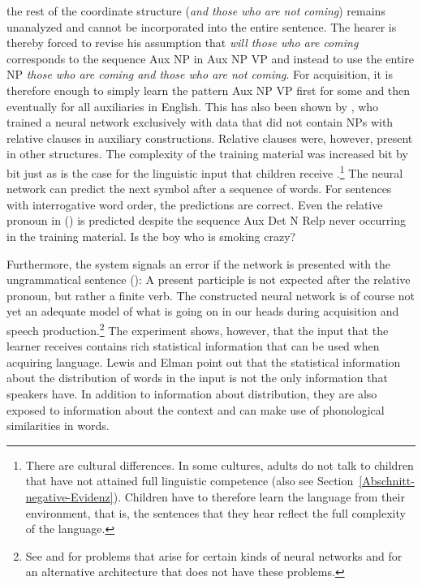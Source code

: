 the rest of the coordinate structure (\emph{and those who are not coming}) remains unanalyzed and cannot be incorporated into the entire sentence.
The hearer is thereby forced to revise his assumption that \emph{will those who are coming} corresponds to the sequence Aux NP in Aux NP VP and instead to
use the entire NP \emph{those who are coming and those who are not coming}.
For acquisition, it is therefore enough to simply learn the pattern Aux NP VP first for some and then eventually for all auxiliaries in English.
This has also been shown by \citet{LE2001a}, who trained a neural network exclusively with data that did not contain NPs with relative
clauses in auxiliary constructions. Relative clauses were, however, present in other structures. The complexity of the training material was increased bit
by bit just as is the case for the linguistic input that children receive
\citep{Elman93a}.\footnote{%
	There are cultural differences. In some cultures, adults do not talk to children that have not attained
	full linguistic competence \citep{Ochs82a,OS85a} (also see
  Section~\ref{Abschnitt-negative-Evidenz}). Children have to therefore learn the language from their environment, that is, the sentences that
  they hear reflect the full complexity of the language.
} The neural network can predict the next symbol after a sequence of words. For sentences with interrogative word order, the predictions are correct.
Even the relative pronoun in () is predicted despite the sequence Aux Det N Relp never occurring in the training material.
\ea
Is the boy who is smoking crazy?
\z

\noindent
Furthermore, the system signals an error if the network is presented with the ungrammatical sentence ():
\z
A present participle is not expected after the relative pronoun, but rather a finite verb. The constructed neural network is of course not yet an adequate model of what is
going on in our heads during acquisition and speech production.\footnote{%
  See \citet[]{Hurford2002a} and \citet[Section~6.2]{Jackendoff2007a} for problems that arise for certain kinds of neural
  networks and \citet{Pulvermueller2003a,Pulvermueller2010a} for an alternative
  architecture that does not have these problems.
} The experiment shows, however, that the input that the learner receives contains rich statistical information that can be
used when acquiring language. Lewis and Elman point out that the statistical information about the distribution of words in the input
is not the only information that speakers have. In addition to information about distribution, they are also exposed to information about the context
and can make use of phonological similarities in words.

